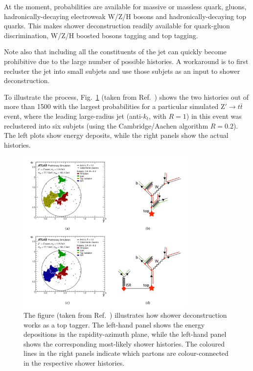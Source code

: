 At the moment, probabilities are available for massive or massless
quark, gluons, hadronically-decaying electroweak W/Z/H bosons and
hadronically-decaying top quarks.
%
This makes shower deconstruction readily available for quark-gluon
discrimination, W/Z/H boosted bosons tagging and top tagging.

Note also that including all the constituents of the jet can quickly
become prohibitive due to the large number of possible histories.
%
A workaround is to first recluster the jet into small subjets and use
those subjets as an input to shower deconstruction.

To illustrate the process, Fig.~\ref{fig:sd_histories} (taken from
Ref.~\cite{ATLAS:2014twa}) shows the two histories out of more than
1500 with the largest probabilities for a particular simulated
$\text{Z}' \to t \bar{t}$ event, where the leading large-radius jet
(anti-$k_t$, with $R = 1$) in this event was reclustered into six
subjets (using the Cambridge/Aachen algorithm $R = 0.2$). The left
plots show energy deposits, while the right panels show the actual
histories.



\begin{figure}
  \centerline{\includegraphics[width=0.79\textwidth]{figures/showerdec_histories.pdf}}
  \caption{The figure (taken from Ref.~\cite{ATLAS:2014twa})
    illustrates how shower deconstruction works as a top tagger. The
    left-hand panel shows the energy depositions in the
    rapidity-azimuth plane, while the left-hand panel shows the
    corresponding most-likely shower histories. The coloured lines in
    the right panels indicate which partons are colour-connected in
    the respective shower histories.}\label{fig:sd_histories}
\end{figure}


